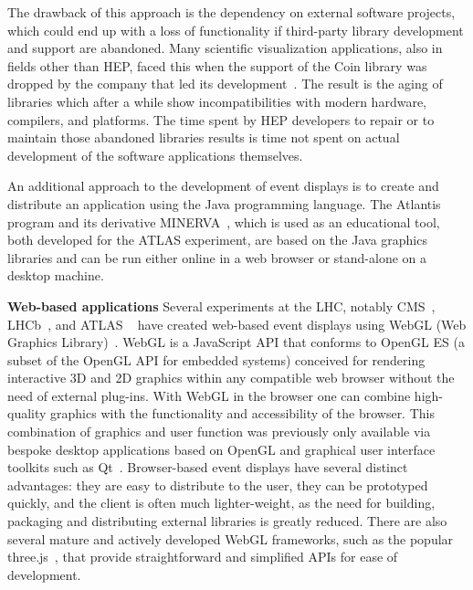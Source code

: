 \documentclass[12pt,a4paper]{article}
\begin{document}
The drawback of this approach is the dependency on external software projects, which could end up with a loss of functionality if
third-party library development and support are abandoned. Many scientific visualization applications, also in fields other than
HEP, faced this when the support of the Coin library was dropped by the company that led its development~\cite{CoinEndOfLifeLetter}.
The result is the aging of libraries which after a while show incompatibilities with modern hardware, compilers, and platforms. The time
spent by HEP developers to repair or to maintain those abandoned libraries results is time not spent on actual development
of the software applications themselves.

An additional approach to the development of event displays is to create and distribute an application using the Java programming language.
The Atlantis~\cite{ATLASAtlantis} program and its derivative MINERVA~\cite{ATLASMinerva}, which is used as an educational tool,
both developed for the ATLAS experiment, are based on the Java graphics libraries and can be run either online in a web browser
or stand-alone on a desktop machine.

{\bf Web-based applications} Several experiments at the LHC, notably CMS~\cite{CMSISpyWebGL}, LHCb~\cite{LHCbOnline2014}, and ATLAS
~\cite{ATLASTada2016, ATLASTracer2015} have created web-based event displays using WebGL (Web Graphics Library)~\cite{WebGL2011}.
WebGL is a JavaScript API that conforms to OpenGL ES (a subset of the OpenGL API for embedded systems) conceived for
rendering interactive 3D and 2D graphics within any compatible web browser without the need of external plug-ins.
With WebGL in the browser one can combine high-quality graphics with the functionality and accessibility of the browser.
This combination of graphics and user function was previously only available via bespoke desktop applications based on OpenGL and
graphical user interface toolkits such as Qt~\cite{QtFramework}. Browser-based event displays have several distinct advantages: they are
easy to distribute to the user, they can be prototyped quickly, and the client is often much lighter-weight,
as the need for building, packaging and distributing external libraries is greatly reduced.
There are also several mature and actively developed WebGL frameworks, such as the popular three.js~\cite{ThreeJS},
that provide straightforward and simplified APIs for ease of development.
\end{document}
